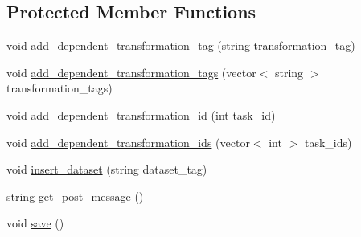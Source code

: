 \subsection*{Protected Member Functions}
\begin{DoxyCompactItemize}
\item 
void \hyperlink{classTask_a404469dca46fda1c94e819345bd478e3}{add\+\_\+dependent\+\_\+transformation\+\_\+tag} (string \hyperlink{classTask_a013314768d0b474bcc567f1cb98a1c01}{transformation\+\_\+tag})
\item 
void \hyperlink{classTask_a861c0dc321a4b0e77f7cbe89dc7da75c}{add\+\_\+dependent\+\_\+transformation\+\_\+tags} (vector$<$ string $>$ transformation\+\_\+tags)
\item 
void \hyperlink{classTask_abe2b72a98501ca9554dd2aa18fad3245}{add\+\_\+dependent\+\_\+transformation\+\_\+id} (int task\+\_\+id)
\item 
void \hyperlink{classTask_ad549fad4fb70003b2f75bf3ae5a41d46}{add\+\_\+dependent\+\_\+transformation\+\_\+ids} (vector$<$ int $>$ task\+\_\+ids)
\item 
void \hyperlink{classTask_ad84f8f6e846b853c5e6b35ba3f0c470f}{insert\+\_\+dataset} (string dataset\+\_\+tag)
\item 
string \hyperlink{classTask_ae9ca005a8b6d0d3d794a7037f517ea20}{get\+\_\+post\+\_\+message} ()
\item 
void \hyperlink{classTask_a139cdf67c69c188c1a3ccc259d01da33}{save} ()
\end{DoxyCompactItemize}
